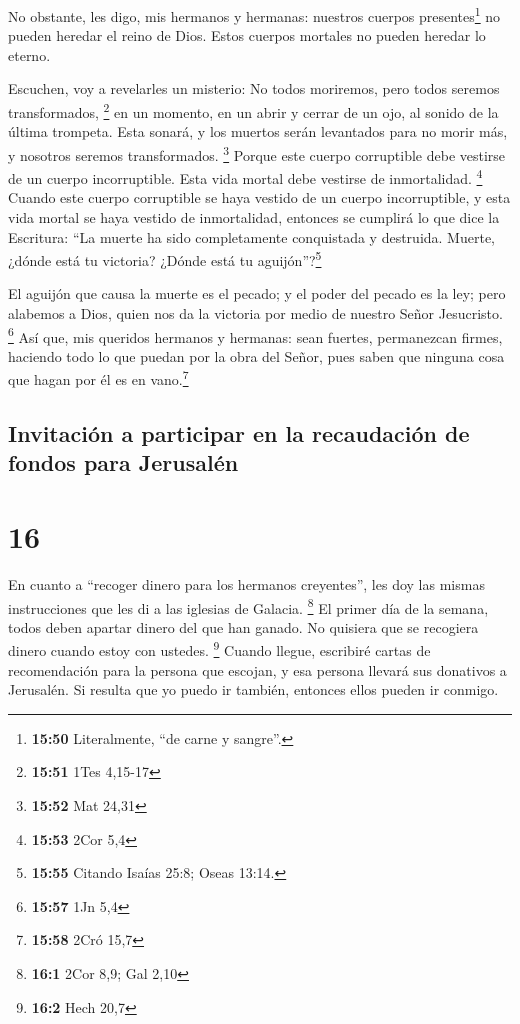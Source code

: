  No obstante, les digo, mis hermanos y hermanas: nuestros
cuerpos presentes\footnote{\textbf{15:50} Literalmente, ``de carne y
  sangre''.} no pueden heredar el reino de Dios. Estos cuerpos mortales
no pueden heredar lo eterno.

 Escuchen, voy a revelarles un misterio: No todos
moriremos, pero todos seremos transformados, \footnote{\textbf{15:51}
  1Tes 4,15-17}  en un momento, en un abrir y cerrar de
un ojo, al sonido de la última trompeta. Esta sonará, y los muertos
serán levantados para no morir más, y nosotros seremos transformados.
\footnote{\textbf{15:52} Mat 24,31}  Porque este cuerpo
corruptible debe vestirse de un cuerpo incorruptible. Esta vida mortal
debe vestirse de inmortalidad. \footnote{\textbf{15:53} 2Cor 5,4}
 Cuando este cuerpo corruptible se haya vestido de un
cuerpo incorruptible, y esta vida mortal se haya vestido de
inmortalidad, entonces se cumplirá lo que dice la Escritura: ``La muerte
ha sido completamente conquistada y destruida.  Muerte,
¿dónde está tu victoria? ¿Dónde está tu aguijón''?\footnote{\textbf{15:55}
  Citando Isaías 25:8; Oseas 13:14.}

 El aguijón que causa la muerte es el pecado; y el poder
del pecado es la ley;  pero alabemos a Dios, quien nos da
la victoria por medio de nuestro Señor Jesucristo. \footnote{\textbf{15:57}
  1Jn 5,4}  Así que, mis queridos hermanos y hermanas:
sean fuertes, permanezcan firmes, haciendo todo lo que puedan por la
obra del Señor, pues saben que ninguna cosa que hagan por él es en
vano.\footnote{\textbf{15:58} 2Cró 15,7}

\hypertarget{invitaciuxf3n-a-participar-en-la-recaudaciuxf3n-de-fondos-para-jerusaluxe9n}{%
\subsection{Invitación a participar en la recaudación de fondos para
Jerusalén}\label{invitaciuxf3n-a-participar-en-la-recaudaciuxf3n-de-fondos-para-jerusaluxe9n}}

\hypertarget{section-15}{%
\section{16}\label{section-15}}

 En cuanto a ``recoger dinero para los hermanos
creyentes'', les doy las mismas instrucciones que les di a las iglesias
de Galacia. \footnote{\textbf{16:1} 2Cor 8,9; Gal 2,10} 
El primer día de la semana, todos deben apartar dinero del que han
ganado. No quisiera que se recogiera dinero cuando estoy con ustedes.
\footnote{\textbf{16:2} Hech 20,7}  Cuando llegue,
escribiré cartas de recomendación para la persona que escojan, y esa
persona llevará sus donativos a Jerusalén.  Si resulta que
yo puedo ir también, entonces ellos pueden ir conmigo.

